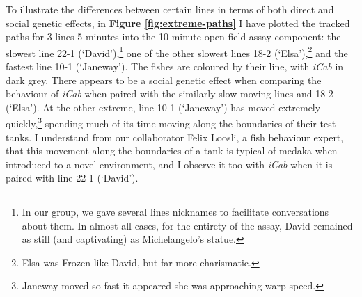 \documentclass[
]{book}
\begin{document}
To illustrate the differences between certain lines in terms of both direct and social genetic effects, in \textbf{Figure \ref{fig:extreme-paths}} I have plotted the tracked paths for 3 lines 5 minutes into the 10-minute open field assay component: the slowest line \textcolor{22-1 (‘David’)_FB737A}{22-1 (‘David’)},\footnote{In our group, we gave several lines nicknames to facilitate conversations about them. In almost all cases, for the entirety of the assay, David remained as still (and captivating) as Michelangelo's statue.} one of the other slowest lines \textcolor{18-2 (‘Elsa’)_FF66A6}{18-2 (‘Elsa’)},\footnote{Elsa was Frozen like David, but far more charismatic.} and the fastest line \textcolor{10-1 (‘Janeway’)_F8766D}{10-1 (‘Janeway’)}. The fishes are coloured by their line, with \emph{\textcolor{iCab_424B4D}{iCab}} in dark grey. There appears to be a social genetic effect when comparing the behaviour of \emph{\textcolor{iCab_424B4D}{iCab}} when paired with the similarly slow-moving lines and \textcolor{18-2 (‘Elsa’)_FF66A6}{18-2 (‘Elsa’)}. At the other extreme, line \textcolor{10-1 (‘Janeway’)_F8766D}{10-1 (‘Janeway’)} has moved extremely quickly,\footnote{Janeway moved so fast it appeared she was approaching warp speed.} spending much of its time moving along the boundaries of their test tanks. I understand from our collaborator Felix Loosli, a fish behaviour expert, that this movement along the boundaries of a tank is typical of medaka when introduced to a novel environment, and I observe it too with \emph{\textcolor{iCab_424B4D}{iCab}} when it is paired with line \textcolor{22-1 (‘David’)_FB737A}{22-1 (‘David’)}.
\end{document}
